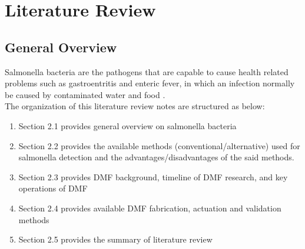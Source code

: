 \chapter{Literature Review}
\section{General Overview}
Salmonella bacteria are the pathogens that are capable to cause health related problems such as gastroentritis and enteric fever, in which an infection normally be caused by contaminated water and food \cite{bellRecentEmergingInnovations2016,pashazadehNanomaterialsUseSensing2017, pacholewiczEnvironmentalSamplingMethods2023,wangRecentAdvances3D2021}.\\

The organization of this literature review notes are structured as below:
\begin{enumerate}
    \item Section 2.1 provides general overview on salmonella bacteria
    \item Section 2.2 provides the available methods (conventional/alternative) used for salmonella detection and the advantages/disadvantages of the said methods.
    \item Section 2.3 provides DMF background, timeline of DMF research, and key operations of DMF
    \item Section 2.4 provides available DMF fabrication, actuation and validation methods
    \item Section 2.5 provides the summary of literature review
\end{enumerate}